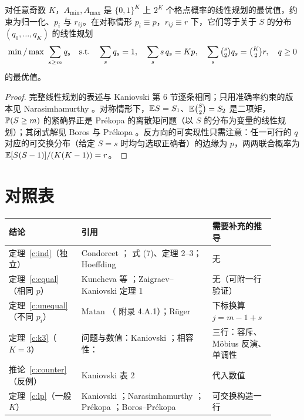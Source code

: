 \documentclass[11pt]{article}
\begin{document}
\begin{theorem}[一般 $K$]\label{c:lp}
对任意奇数 $K$，$A_{\min},A_{\max}$ 是 $\{0,1\}^K$ 上 $2^K$ 个格点概率的线性规划的最优值，约束为归一化、$p_i$ 与 $r_{ij}$。在对称情形 $p_i\equiv p$，$r_{ij}\equiv r$ 下，它们等于关于 $S$ 的分布 $(q_0,\dots,q_K)$ 的线性规划
\[
\min/\max\ \sum_{s\ge m}q_s\quad\text{s.t.}\quad\sum_sq_s=1,\quad\sum_s s\,q_s=Kp,\quad\sum_s\tbinom s2q_s=\tbinom K2r,\quad q\ge0
\]
的最优值。
\end{theorem}
\begin{proof}
完整线性规划的表述与 Kaniovski \cite{kaniovski2010} 第 6 节逐条相同；只用准确率约束的版本见 Narasimhamurthy \cite{nara2003,nara2005}。对称情形下，$\mathbb{E} S=S_1$、$\mathbb{E}\binom S2=S_2$ 是二项矩，$\mathbb{P}(S\ge m)$ 的紧确界正是 Prékopa \cite{prekopa1988,prekopa1990} 的离散矩问题（以 $S$ 的分布为变量的线性规划）；其闭式解见 Boros 与 Prékopa \cite{borosprekopa}。反方向的可实现性只需注意：任一可行的 $q$ 对应的可交换分布（给定 $S=s$ 时均匀选取正确者）的边缘为 $p$，两两联合概率为 $\mathbb{E}[S(S-1)]/(K(K-1))=r$。
\end{proof}

\section{对照表}

\begin{center}
\small
\renewcommand{\arraystretch}{1.3}
\begin{tabular}{>{\raggedright\arraybackslash}p{0.25\linewidth}>{\raggedright\arraybackslash}p{0.45\linewidth}>{\raggedright\arraybackslash}p{0.20\linewidth}}
\toprule
结论 & 引用 & 需要补充的推导\\
\midrule
定理~\ref{c:ind}（独立） & Condorcet \cite{condorcet}；\cite{shteingart} 式 (7)、定理 2–3；Hoeffding \cite{hoeffding} & 无\\
定理~\ref{c:equal}（相同 $p$） & Kuncheva 等 \cite{kuncheva2003}；Zaigraev--Kaniovski \cite{zk2012} 定理 1 & 无（可附一行验证）\\
定理~\ref{c:unequal}（不同 $p_i$） & Matan \cite{matan}（\cite{kunchevabook} 附录 4.A.1）；Rüger \cite{ruger} & 下标换算 $j=m-1+s$\\
定理~\ref{c:k3}（$K=3$） & 问题与数值：Kaniovski \cite{kaniovski2010}；相容性：\cite{chaganty} & 三行：容斥、Möbius 反演、单调性\\
推论~\ref{c:counter}（反例） & Kaniovski \cite{kaniovski2010} 表 2 & 代入数值\\
定理~\ref{c:lp}（一般 $K$） & Kaniovski \cite{kaniovski2010}；Narasimhamurthy \cite{nara2003,nara2005}；Prékopa \cite{prekopa1988,prekopa1990}；Boros--Prékopa \cite{borosprekopa} & 可交换构造一行\\
\bottomrule
\end{tabular}
\end{center}
\end{document}
